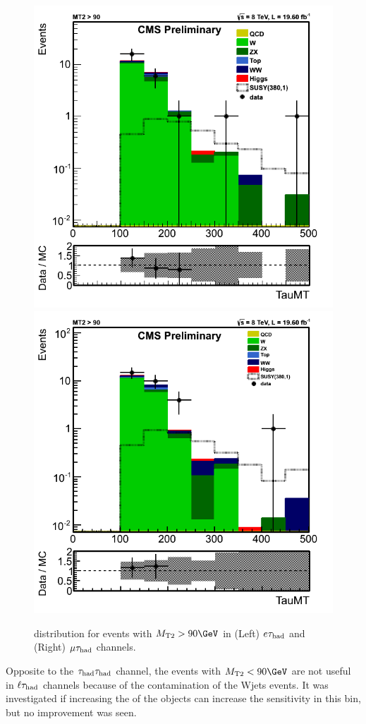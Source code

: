 \begin{figure}[!Hhtb]
\centering
\includegraphics[angle=0,scale=0.35]{SelectionEleTau/TauMT.png}
\includegraphics[angle=0,scale=0.35]{SelectionMuTau/tauMT_Ratio_MT2gt90_unBlinded.png}
\caption{\tauMT distribution for events with $\mttwo>90\GeV$ in (Left) $e\tau_{\rm had}$ and (Right) $\mu\tau_{\rm had}$ channels.}
\label{fig:taumtleptontau}
\end{figure}
Opposite to the $\tau_{\rm had}\tau_{\rm had}$ channel, the events with $\mttwo<90 \GeV$ are not useful in $\ell\tau_{\rm had}$ channels because of the contamination of 
the Wjets events. It was investigated if increasing the \pt of the objects can increase the sensitivity in this bin, but no improvement was seen.

